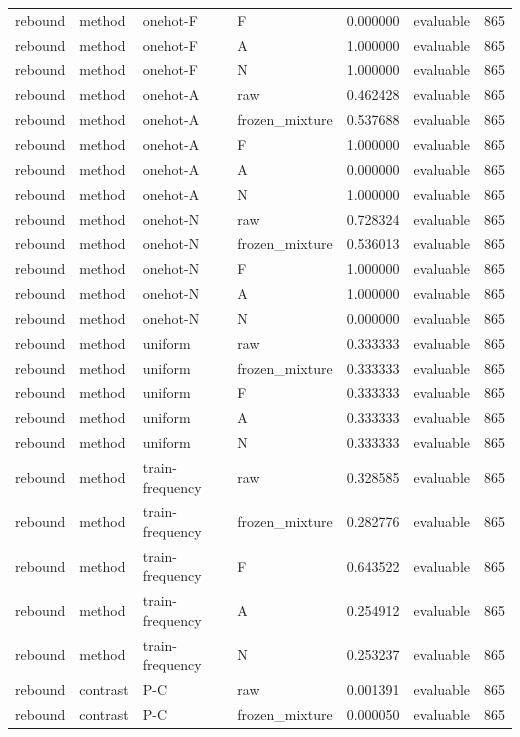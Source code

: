 \begin{longtable}{llllrlr}
rebound & method & onehot-F & F & 0.000000 & evaluable & 865 \\
rebound & method & onehot-F & A & 1.000000 & evaluable & 865 \\
rebound & method & onehot-F & N & 1.000000 & evaluable & 865 \\
rebound & method & onehot-A & raw & 0.462428 & evaluable & 865 \\
rebound & method & onehot-A & frozen\_mixture & 0.537688 & evaluable & 865 \\
rebound & method & onehot-A & F & 1.000000 & evaluable & 865 \\
rebound & method & onehot-A & A & 0.000000 & evaluable & 865 \\
rebound & method & onehot-A & N & 1.000000 & evaluable & 865 \\
rebound & method & onehot-N & raw & 0.728324 & evaluable & 865 \\
rebound & method & onehot-N & frozen\_mixture & 0.536013 & evaluable & 865 \\
rebound & method & onehot-N & F & 1.000000 & evaluable & 865 \\
rebound & method & onehot-N & A & 1.000000 & evaluable & 865 \\
rebound & method & onehot-N & N & 0.000000 & evaluable & 865 \\
rebound & method & uniform & raw & 0.333333 & evaluable & 865 \\
rebound & method & uniform & frozen\_mixture & 0.333333 & evaluable & 865 \\
rebound & method & uniform & F & 0.333333 & evaluable & 865 \\
rebound & method & uniform & A & 0.333333 & evaluable & 865 \\
rebound & method & uniform & N & 0.333333 & evaluable & 865 \\
rebound & method & train-frequency & raw & 0.328585 & evaluable & 865 \\
rebound & method & train-frequency & frozen\_mixture & 0.282776 & evaluable & 865 \\
rebound & method & train-frequency & F & 0.643522 & evaluable & 865 \\
rebound & method & train-frequency & A & 0.254912 & evaluable & 865 \\
rebound & method & train-frequency & N & 0.253237 & evaluable & 865 \\
rebound & contrast & P-C & raw & 0.001391 & evaluable & 865 \\
rebound & contrast & P-C & frozen\_mixture & 0.000050 & evaluable & 865 \\

\end{longtable}
